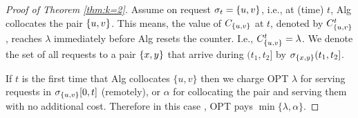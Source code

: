 \documentclass[manuscript,screen=true, review, anonymous]{acmart}
\DeclarePairedDelimiter\set{\{}{\}}
\begin{document}
\begin{proof}[Proof of Theorem \ref{thm:k=2}]
	Assume on request $\sigma_{t}=\set{u,v}$, 
	i.e., at (time) $t$,
	Alg collocates the pair $\set{u,v}$.
	This means,
	the value of $C_{\set{u,v}}$ at $t$,
	denoted by $C^t_{\set{u,v}}$, 
	reaches $\lambda$ immediately before Alg resets the counter.
	I.e.,
	$ C^t_{\set{u,v}} = \lambda$.
	We denote the set of all requests to a pair $\set{x,y}$ that arrive
	during $(t_1,t_2]$ by $\sigma_{\set{x,y}}(t_1,t_2]$.

	If $t$ is the first time that Alg collocates $\{u,v\}$ then we  charge
	OPT $\lambda$ for serving requests in $\sigma_{\set{u,v}}[0,t]$ (remotely),
	 or $\alpha$ for collocating the pair and serving them with no additional cost.
	Therefore in this case ,
	OPT pays $\min{\{ \lambda,\alpha \}}$.
	

\end{proof}
\end{document}
